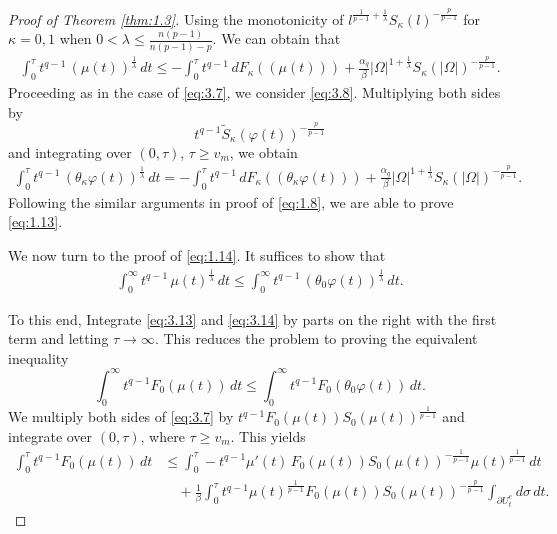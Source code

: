 \documentclass[11pt]{article}
\numberwithin{equation}{section}
\theoremstyle{definition}
\theoremstyle{remark}
\begin{document}
\begin{proof}[Proof of Theorem \ref{thm:1.3}]
Using the monotonicity of $l^{\frac{1}{p-1}+\frac{1}{\lambda}}S_\kappa(l)^{-\frac{p}{p-1}}$ for $\kappa=0,1$ when $0 < \lambda\le \frac{n(p-1)}{n(p-1)-p}$. We can obtain that
\begin{align}\label{eq:3.13}
\int_0^\tau t^{q-1}\,(\mu(t))^{\frac{1}{\lambda}}\,dt
\le
-\int_0^\tau t^{q-1}\,dF_\kappa((\mu(t)))
+\frac{\alpha_q}{\beta}
|\Omega|^{1+\frac{1}{\lambda}}S_\kappa(|\Omega|)^{-\frac{p}{p-1}}.
\end{align}
Proceeding as in the case of \eqref{eq:3.7}, we consider \eqref{eq:3.8}. Multiplying both sides by
\[
t^{q-1}\tilde{S}_\kappa(\varphi(t))^{-\frac{p}{p-1}}
\]
and integrating over $(0,\tau)$, $\tau \ge v_m$, we obtain
\begin{align}\label{eq:3.14}
\int_0^\tau t^{q-1}\,(\theta_\kappa\varphi(t))^{\frac{1}{\lambda}}\,dt
=
-\int_0^\tau t^{q-1}\,dF_\kappa((\theta_\kappa\varphi(t)))
+\frac{\alpha_q}{\beta}
|\Omega|^{1+\frac{1}{\lambda}}S_\kappa(|\Omega|)^{-\frac{p}{p-1}}.
\end{align}
Following the similar arguments in proof of \eqref{eq:1.8}, we are able to prove \eqref{eq:1.13}.
\par
We now turn to the proof of \eqref{eq:1.14}. It suffices to show that
\begin{align*}
\int_0^\infty t^{q-1}\,\mu(t)^{\frac{1}{\lambda}}\,dt
\le
\int_0^\infty t^{q-1}\,(\theta_0\varphi(t))^{\frac{1}{\lambda}}\,dt.
\end{align*}

To this end, Integrate \eqref{eq:3.13} and \eqref{eq:3.14} by parts on the right with the first term and letting $\tau\to\infty$. This reduces the problem to proving the equivalent inequality
\[
\int_0^\infty t^{q-1}F_0(\mu(t))\,dt
\le
\int_0^\infty t^{q-1}F_0(\theta_0 \varphi(t))\,dt.
\]
We multiply both sides of \eqref{eq:3.7} by
$t^{q-1} F_0(\mu(t)) S_0(\mu(t))^{\frac{1}{p-1}}$
and integrate over $(0,\tau)$, where $\tau \ge v_m$. This yields
\begin{align*}
\int_0^\tau t^{q-1} F_0(\mu(t))\,dt
&\le
\int_0^\tau -t^{q-1}\mu'(t)\, F_0(\mu(t)) S_0(\mu(t))^{-\frac{1}{p-1}}
\mu(t)^{\frac{1}{p-1}}\,dt \\
&\quad +
\frac{1}{\beta}
\int_0^\tau t^{q-1}\mu(t)^{\frac{1}{p-1}} F_0(\mu(t))
S_0(\mu(t))^{-\frac{p}{p-1}}
\int_{\partial U_t^e} d\sigma\, dt.
\end{align*}


\end{proof}
\end{document}
